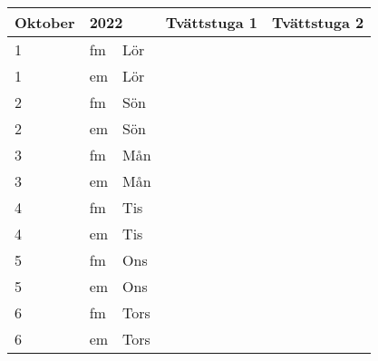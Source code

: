 \documentclass[a4paper]{article}
\begin{document}
\begin{table}[ht!]
\vspace{-10em}%
\normalsize
\begin{tabular}{lllp{7cm}p{7cm}}
\textbf{Oktober}           & \multicolumn{2}{l}{\textbf{2022}}                  & \textbf{Tvättstuga 1} & \textbf{Tvättstuga 2} \\ \hline    

\multicolumn{1}{|l|}{1} & \multicolumn{1}{l|}{fm} & \multicolumn{1}{l|}{Lör} & \multicolumn{1}{l|}{} & \multicolumn{1}{l|}{} \\ \hline
\multicolumn{1}{|l|}{1} & \multicolumn{1}{l|}{em} & \multicolumn{1}{l|}{Lör} & \multicolumn{1}{l|}{} & \multicolumn{1}{l|}{} \\ \hline    

\multicolumn{1}{|l|}{2} & \multicolumn{1}{l|}{fm} & \multicolumn{1}{l|}{Sön} & \multicolumn{1}{l|}{} & \multicolumn{1}{l|}{} \\ \hline
\multicolumn{1}{|l|}{2} & \multicolumn{1}{l|}{em} & \multicolumn{1}{l|}{Sön} & \multicolumn{1}{l|}{} & \multicolumn{1}{l|}{} \\ \hline    

\multicolumn{1}{|l|}{3} & \multicolumn{1}{l|}{fm} & \multicolumn{1}{l|}{Mån} & \multicolumn{1}{l|}{} & \multicolumn{1}{l|}{} \\ \hline
\multicolumn{1}{|l|}{3} & \multicolumn{1}{l|}{em} & \multicolumn{1}{l|}{Mån} & \multicolumn{1}{l|}{} & \multicolumn{1}{l|}{} \\ \hline    

\multicolumn{1}{|l|}{4} & \multicolumn{1}{l|}{fm} & \multicolumn{1}{l|}{Tis} & \multicolumn{1}{l|}{} & \multicolumn{1}{l|}{} \\ \hline
\multicolumn{1}{|l|}{4} & \multicolumn{1}{l|}{em} & \multicolumn{1}{l|}{Tis} & \multicolumn{1}{l|}{} & \multicolumn{1}{l|}{} \\ \hline    

\multicolumn{1}{|l|}{5} & \multicolumn{1}{l|}{fm} & \multicolumn{1}{l|}{Ons} & \multicolumn{1}{l|}{} & \multicolumn{1}{l|}{} \\ \hline
\multicolumn{1}{|l|}{5} & \multicolumn{1}{l|}{em} & \multicolumn{1}{l|}{Ons} & \multicolumn{1}{l|}{} & \multicolumn{1}{l|}{} \\ \hline    

\multicolumn{1}{|l|}{6} & \multicolumn{1}{l|}{fm} & \multicolumn{1}{l|}{Tors} & \multicolumn{1}{l|}{} & \multicolumn{1}{l|}{} \\ \hline
\multicolumn{1}{|l|}{6} & \multicolumn{1}{l|}{em} & \multicolumn{1}{l|}{Tors} & \multicolumn{1}{l|}{} & \multicolumn{1}{l|}{} \\ \hline    


\end{tabular}
\end{table}
\end{document}
